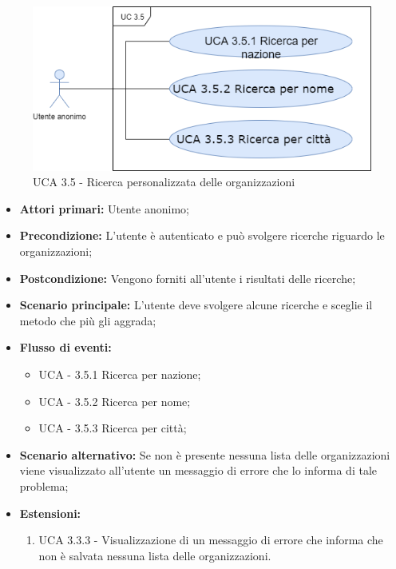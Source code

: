 \begin{figure}[h]
	\centering
	
	\includegraphics[scale=0.5]{sezioni/UseCase/Immagini/UCA3.5.png}
	\caption{UCA 3.5 - Ricerca personalizzata delle organizzazioni}
\end{figure}

\begin{itemize}
	\item \textbf{Attori primari:} Utente anonimo;
	\item \textbf{Precondizione:} L'utente è autenticato e può svolgere ricerche riguardo le organizzazioni;
	\item \textbf{Postcondizione:} Vengono forniti all'utente i risultati delle ricerche;
	\item \textbf{Scenario principale:} L'utente deve svolgere alcune ricerche e sceglie il metodo che più gli aggrada;
	\item \textbf{Flusso di eventi:} 
	\begin{itemize}
		\item UCA - 3.5.1 Ricerca per nazione;
		\item UCA - 3.5.2 Ricerca per nome;
		\item UCA - 3.5.3 Ricerca per città;
	\end{itemize}
	\item \textbf{Scenario alternativo:} Se non è presente nessuna lista delle organizzazioni viene visualizzato all'utente un messaggio di errore che lo informa di tale problema;
	\item \textbf{Estensioni:}
	\begin{enumerate}
		\item UCA 3.3.3 - Visualizzazione di un messaggio di errore che informa che non è salvata nessuna lista delle organizzazioni.
	\end{enumerate}
\end{itemize}

